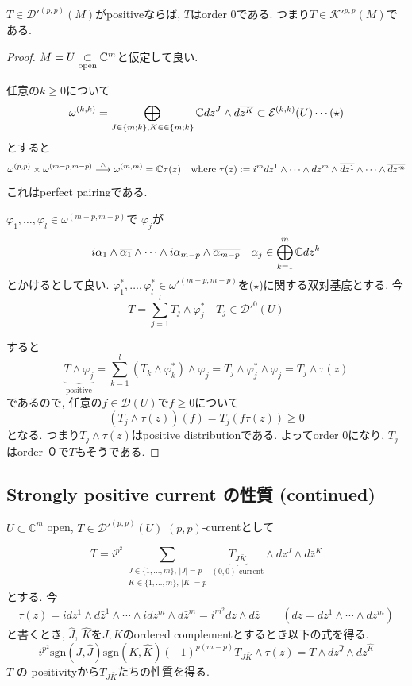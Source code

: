 \begin{tcolorbox}[mybox]
\begin{lem}
\label{lem-M-7.4.10}
$T \in {\mathcal{D}'}^{(p,p)}(M)$がpositiveならば, $T$はorder 0である. 
つまり$T \in {\mathcal{K}'}^{p,p}(M)$である. 
\end{lem}
\end{tcolorbox}
\begin{proof}
$M=U \underset{\text{open}}{\subset} \mathbb{C}^m$と仮定して良い. 

任意の$k \ge 0$について
$$
\omega^{(k,k)}
=
 \bigoplus_{J \in \{m ; k\}, K \in \in \{m; k \}}
\mathbb{C} dz^J \wedge d \overline{z^K}
\subset  {\mathcal{E}}^{(k,k)}(U)
\cdots \text{($\star$)}
$$
とすると
$$
\omega^{(p,p)} 
\times 
\omega^{(m-p,m-p)} 
\overset{\wedge}{\longrightarrow}
\omega^{(m,m)}
=\mathbb{C} \tau(z)
\quad 
\text{where }
\tau(z):= i^{m}dz^1 \wedge \cdots \wedge dz^m \wedge \overline{dz^1} \wedge \cdots \wedge \overline{dz^m}
$$
これはperfect pairingである. 

$\varphi_1, \ldots, \varphi_l \in \omega^{(m-p,m-p)}$で
$\varphi_j$が
$$
i\alpha_1\wedge\overline{\alpha_1}\wedge\cdots\wedge
i\alpha_{m-p}\wedge\overline{\alpha_{m-p}}
\quad 
\alpha_j \in \bigoplus_{k=1}^{m} \mathbb{C} dz^k
$$
とかけるとして良い. 
$\varphi^{*}_1, \ldots, \varphi^{*}_l \in {\omega'}^{(m-p,m-p)}$を($\star$)に関する双対基底とする. 
今
$$
T=\sum_{j=1}^{l} T_j \wedge \varphi^{*}_j
\quad 
T_j \in {\mathcal{D}'}^{0}(U)
$$

すると
$$
\underbrace{T \wedge \varphi_j}_{\text{positive}}
=
\sum_{k=1}^{l}
(T_k \wedge \varphi^{*}_k) \wedge \varphi_j
= T_j \wedge \varphi^{*}_j\wedge \varphi_j
= T_j \wedge \tau (z)
$$
であるので, 任意の$f \in \mathcal{D}(U)$で$f \ge 0$について
$$
(T_j \wedge \tau (z))(f)
= T_j (f \tau(z)) \ge 0
$$
となる. 
つまり$T_j \wedge \tau (z)$はpositive distributionである. 
よってorder 0になり, $T_j$はorder ０で$T$もそうである. 
\end{proof}


\subsection{Strongly positive current の性質 (continued)}
$U \subset \mathbb{C}^m$ open, $T \in \mathcal{D}'^{(p,p)}(U)$ $(p,p)$-currentとして

\begin{equation*}
T = i^{p^2} \sum_{\substack{J\in\{1,\ldots,m\},\, |J|=p\\ K\in\{1,\ldots,m\},\, |K|=p}} \underbrace{T_{J\bar K}}_{\text{$(0,0)$-current}} \wedge dz^J \wedge d\bar z^K
\end{equation*}
とする. 今
\begin{align*}
\tau(z) = i dz^1 \wedge d\bar z^1 \wedge \cdots \wedge i dz^m \wedge d\bar z^m
= i^{m^2} dz \wedge d\bar z \qquad (dz = dz^1 \wedge \cdots \wedge dz^m)
\end{align*}
と書くとき, $\hat{J}$, $\hat{K}$を$J, K$のordered complementとするとき以下の式を得る.
\[
i^{p^{2}}
\mathrm{sgn}(J, \widehat{J})
\mathrm{sgn}(K, \widehat{K})
(-1)^{p(m-p)}
T_{J \bar K}
\wedge 
\tau(z)
=T \wedge dz^{\hat{J}} \wedge  d \bar{z}^{\hat{K}}
\]
$T$ の positivityから$T_{J\bar K}$たちの性質を得る. 

